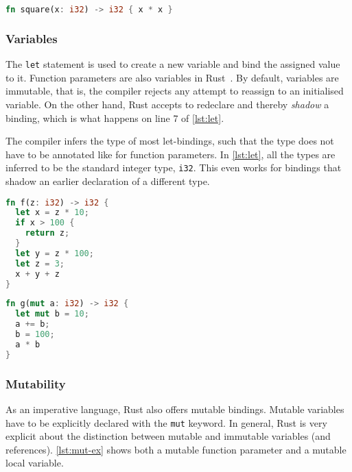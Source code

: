 \begin{lstlisting}[style=short, language=Rust, caption={A simple Rust function.}, label=lst:first-ex]
fn square(x: i32) -> i32 { x * x }
\end{lstlisting}

\subsubsection{Variables}

The \lstinline!let! statement is used to create a new variable and bind the
assigned value to it. Function parameters are also variables in
Rust~\cite{rustref}. By default, variables are immutable, that is, the compiler
rejects any attempt to reassign to an initialised variable. On the other hand,
Rust accepts to redeclare and thereby \emph{shadow} a binding, which is what
happens on line 7 of \autoref{lst:let}.

The compiler infers the type of most let-bindings, such that the type does not
have to be annotated like for function parameters. In \autoref{lst:let}, all the
types are inferred to be the standard integer type, \lstinline!i32!. This even
works for bindings that shadow an earlier declaration of a different type.

\noindent\begin{minipage}[t]{.45\textwidth}
\begin{lstlisting}[language=Rust, caption={A Rust function doing some arithmetics.}, label=lst:let]
fn f(z: i32) -> i32 {
  let x = z * 10;
  if x > 100 {
    return z;
  }
  let y = z * 100;
  let z = 3;
  x + y + z
}
\end{lstlisting}
\end{minipage}\hfill
\begin{minipage}[t]{.45\textwidth}
\begin{lstlisting}[language=Rust, caption={Mutable variable bindings.}, label=lst:mut-ex]
fn g(mut a: i32) -> i32 {
  let mut b = 10;
  a += b;
  b = 100;
  a * b
}
\end{lstlisting}
\end{minipage}

\subsubsection{Mutability}

As an imperative language, Rust also offers mutable bindings. Mutable variables
have to be explicitly declared with the \lstinline!mut! keyword. In general,
Rust is very explicit about the distinction between mutable and immutable
variables (and references). \autoref{lst:mut-ex} shows both a mutable function
parameter and a mutable local variable.

